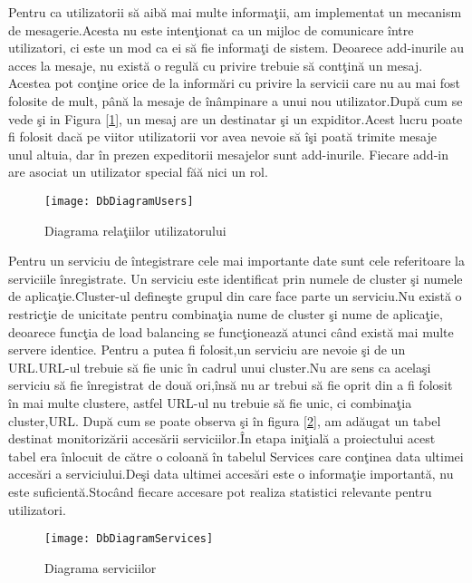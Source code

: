 \documentclass[a4paper,12pt]{report}
\let\oldref\ref
\renewcommand{\ref}[1]{[\oldref{#1}]}
\begin{document}
Pentru ca utilizatorii s\u a aib\u a mai multe informa\c tii, am implementat un mecanism de mesagerie.Acesta nu este 
inten\c tionat ca un mijloc de comunicare \^intre utilizatori, ci este un mod ca ei s\u a fie informa\c ti de sistem.
Deoarece add-inurile au acces la mesaje, nu exist\u a o regul\u a cu privire trebuie s\u a cont\c tin\u a un mesaj.
Acestea pot con\c tine orice de la inform\u ari cu privire la servicii care nu au mai fost folosite de mult, p\^an\u a
la mesaje de \^in\^ampinare a unui nou utilizator.Dup\u a cum se vede \c si in Figura \ref{fig:DbUser}, un mesaj 
are un destinatar \c si un expiditor.Acest lucru poate fi folosit dac\u a pe viitor utilizatorii vor avea nevoie s\u a
 \^i\c si poat\u a trimite mesaje unul altuia, dar \^in prezen expeditorii mesajelor sunt add-inurile.
 Fiecare add-in are asociat un utilizator special f\u a\u a nici un rol.


\begin{figure}
	\texttt{[image: DbDiagramUsers]}
	\caption{Diagrama rela\c tiilor utilizatorului}
	\label{fig:DbUser}
\end{figure}

Pentru un serviciu de \^integistrare cele mai importante date sunt cele referitoare la serviciile \^inregistrate.
Un serviciu este identificat prin numele de cluster \c si numele de aplica\c tie.Cluster-ul define\c ste grupul
din care face parte un serviciu.Nu exist\u a o restric\c tie de unicitate pentru combina\c tia nume de cluster \c si
nume de aplica\c tie, deoarece func\c tia de load balancing se func\c tioneaz\u a atunci c\^and exist\u a mai multe 
servere identice. Pentru a putea fi folosit,un serviciu are nevoie \c si de un URL.URL-ul trebuie s\u a fie unic \^in 
cadrul unui cluster.Nu are sens ca acela\c si serviciu s\u a fie \^inregistrat de dou\u a ori,\^ins\u a nu ar trebui 
s\u a fie oprit din a fi folosit \^in mai multe clustere, astfel URL-ul nu trebuie s\u a fie unic, ci combina\c tia 
cluster,URL. Dup\u a cum se poate observa \c si \^in figura \ref{fig:DbServices}, am ad\u augat un tabel destinat
monitoriz\u arii acces\u arii serviciilor.\^In etapa ini\c tial\u a a proiectului acest tabel era \^inlocuit de 
c\u atre o coloan\u a \^in tabelul Services care con\c tinea data ultimei acces\u ari a serviciului.De\c si 
data ultimei acces\u ari este o informa\c tie important\u a, nu este suficient\u a.Stoc\^and fiecare accesare 
pot realiza statistici relevante pentru utilizatori.

\begin{figure}[!ht]
	\texttt{[image: DbDiagramServices]}
	\caption{Diagrama serviciilor}
	\label{fig:DbServices}
\end{figure}
\end{document}
